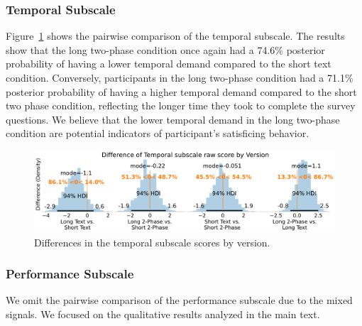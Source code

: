 \subsubsection{Temporal Subscale}
\label{sec:temporal_subscale_bayesian}
Figure~\ref{fig:bayesian_temporal_subscale} shows the pairwise comparison of the temporal subscale. The results show that the long two-phase condition once again had a 74.6\% posterior probability of having a lower temporal demand compared to the short text condition. Conversely, participants in the long two-phase condition had a 71.1\% posterior probability of having a higher temporal demand compared to the short two phase condition, reflecting the longer time they took to complete the survey questions. We believe that the lower temporal demand in the long two-phase condition are potential indicators of participant's satisficing behavior.

\begin{figure}[h!]
    \centering
    \includegraphics[width=\textwidth]{content/image/cog/Temporal_cog_diff_single_row.pdf}
    \caption{Differences in the temporal subscale scores by version.}
    \label{fig:bayesian_temporal_subscale}
\end{figure}

\subsubsection{Performance Subscale}
We omit the pairwise comparison of the performance subscale due to the mixed signals. We focused on the qualitative results analyzed in the main text.


